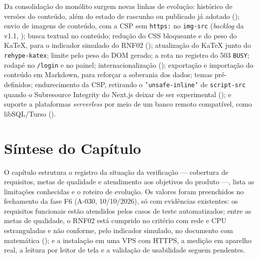 Da consolidação do monólito surgem novas linhas de evolução: histórico de versões do conteúdo, além do estado de rascunho ou publicado já adotado (); envio de imagens de conteúdo, com a CSP sem \texttt{https:} no \texttt{img-src} (\emph{backlog} da v1.1, ); busca textual no conteúdo; redução do CSS bloqueante e do peso do KaTeX, para o indicador simulado do RNF02 (); atualização do KaTeX junto do \texttt{rehype-katex}; limite pelo peso do DOM gerado; a rota no registro do 503 \texttt{BUSY}; rodapé no \texttt{/login} e no painel; internacionalização (); exportação e importação do conteúdo em Markdown, para reforçar a soberania dos dados; temas pré-definidos; endurecimento da CSP, retirando o \texttt{'unsafe-inline'} de \texttt{script-src} quando o Subresource Integrity do Next.js deixar de ser experimental (); e suporte a plataformas \emph{serverless} por meio de um banco remoto compatível, como libSQL/Turso ().

\section{Síntese do Capítulo}

O capítulo estrutura o registro da situação da verificação --- cobertura de requisitos, metas de qualidade e atendimento aos objetivos do produto ---, lista as limitações conhecidas e o roteiro de evolução. Os valores foram preenchidos no fechamento da fase F6 (A-030, 10/10/2026), só com evidências existentes: os requisitos funcionais estão atendidos pelos casos de teste automatizados; entre as metas de qualidade, o RNF02 está cumprido no critério com rede e CPU estranguladas e não conforme, pelo indicador simulado, no documento com matemática (); e a instalação em uma VPS com HTTPS, a medição em aparelho real, a leitura por leitor de tela e a validação de usabilidade seguem pendentes.
